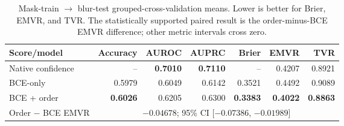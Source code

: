 \begin{table}[t]
\centering
\caption{Mask-train $\rightarrow$ blur-test grouped-cross-validation means. Lower is better for Brier, EMVR, and TVR. The statistically supported paired result is the order-minus-BCE EMVR difference; other metric intervals cross zero.}
\label{tab:transfer}
\small
\begin{tabular}{lrrrrrr}
\toprule
Score/model & Accuracy & AUROC & AUPRC & Brier & EMVR & TVR \\
\midrule
Native confidence & -- & \textbf{0.7010} & \textbf{0.7110} & -- & 0.4207 & 0.8921 \\
BCE-only & 0.5979 & 0.6049 & 0.6142 & 0.3521 & 0.4492 & 0.9089 \\
BCE + order & \textbf{0.6026} & 0.6205 & 0.6300 & \textbf{0.3383} & \textbf{0.4022} & \textbf{0.8863} \\
\midrule
Order $-$ BCE EMVR & \multicolumn{6}{c}{$-0.04678$; 95\% CI [$-0.07386$, $-0.01989$]} \\
\bottomrule
\end{tabular}
\end{table}
